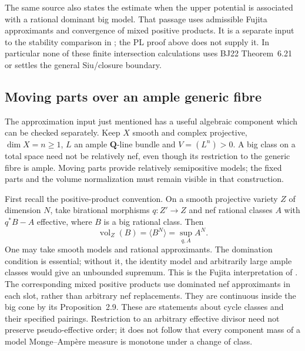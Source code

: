 The same source also states the estimate when the upper potential is
associated with a rational dominant big model. That passage uses
admissible Fujita approximants and convergence of mixed positive
products. It is a separate input to the stability comparison in
; the PL proof above does not supply it.
In particular none of these finite intersection calculations uses
BJ22 Theorem~6.21 or settles the general Siu/closure boundary.

\subsection{Moving parts over an ample generic fibre}
\label{sec:ch46-ample-generic-moving-parts}

The approximation input just mentioned has a useful algebraic component
which can be checked separately. Keep $X$ smooth and complex projective,
$\dim X=n\geq1$, $L$ an ample $\mathbf Q$-line bundle and
$V=(L^n)>0$. A big class on a total space need not be relatively nef,
even though its restriction to the generic fibre is ample. Moving parts
provide relatively semipositive models; the fixed parts and the volume
normalization must remain visible in that construction.

First recall the positive-product convention. On a smooth projective
variety $Z$ of dimension $N$, take birational morphisms
$q:Z'\to Z$ and nef rational classes $A$ with $q^*B-A$ effective,
where $B$ is a big rational class. Then
\[
 \operatorname{vol}_Z(B)=\langle B^N\rangle
                       =\sup_{q,A} A^N.
\tag{46.10e}\label{eq:ch46-dominated-nef-volume}
\]
One may take smooth models and rational approximants. The domination
condition is essential; without it, the identity model and arbitrarily
large ample classes would give an unbounded supremum. This is the
Fujita interpretation of \cite[Definition~2.5 and Theorem~3.1]{BFJ09}.
The corresponding mixed positive products use dominated nef
approximants in each slot, rather than arbitrary nef replacements.
They are continuous inside the big cone by its Proposition~2.9.
These are statements about cycle classes and their specified pairings.
Restriction to an arbitrary effective divisor need not preserve
pseudo-effective order; it does not follow that every component mass
of a model Monge--Amp\`ere measure is monotone under a change of class.

